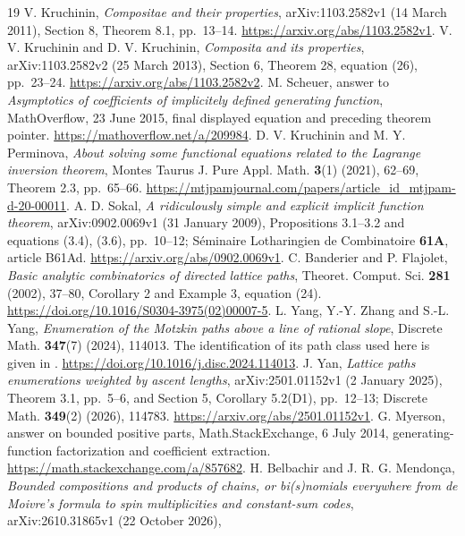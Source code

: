\documentclass[11pt]{article}
\begin{document}
\begin{thebibliography}{19}
 V. Kruchinin, \emph{Compositae and their properties},
arXiv:1103.2582v1 (14 March 2011), Section 8, Theorem 8.1, pp.~13--14.
\url{https://arxiv.org/abs/1103.2582v1}.
 V. V. Kruchinin and D. V. Kruchinin,
\emph{Composita and its properties}, arXiv:1103.2582v2 (25 March 2013),
Section 6, Theorem 28, equation (26), pp.~23--24.
\url{https://arxiv.org/abs/1103.2582v2}.
 M. Scheuer, answer to \emph{Asymptotics of coefficients
of implicitely defined generating function}, MathOverflow,
23 June 2015, final displayed equation and preceding theorem pointer.
\url{https://mathoverflow.net/a/209984}.
 D. V. Kruchinin and M. Y. Perminova,
\emph{About solving some functional equations related to the Lagrange
inversion theorem}, Montes Taurus J. Pure Appl. Math. \textbf{3}(1)
(2021), 62--69, Theorem 2.3, pp.~65--66.
\url{https://mtjpamjournal.com/papers/article_id_mtjpam-d-20-00011}.
 A. D. Sokal, \emph{A ridiculously simple and explicit
implicit function theorem}, arXiv:0902.0069v1 (31 January 2009),
Propositions 3.1--3.2 and equations (3.4), (3.6), pp.~10--12;
S\'eminaire Lotharingien de Combinatoire \textbf{61A}, article B61Ad.
\url{https://arxiv.org/abs/0902.0069v1}.
 C. Banderier and P. Flajolet,
\emph{Basic analytic combinatorics of directed lattice paths},
Theoret. Comput. Sci. \textbf{281} (2002), 37--80, Corollary 2
and Example 3, equation (24).
\url{https://doi.org/10.1016/S0304-3975(02)00007-5}.
 L. Yang, Y.-Y. Zhang and S.-L. Yang,
\emph{Enumeration of the Motzkin paths above a line of rational slope},
Discrete Math. \textbf{347}(7) (2024), 114013.
The identification of its path class used here is given in
\cite[Section 5]{yan}.
\url{https://doi.org/10.1016/j.disc.2024.114013}.
 J. Yan, \emph{Lattice paths enumerations weighted by
ascent lengths}, arXiv:2501.01152v1 (2 January 2025), Theorem 3.1,
pp.~5--6, and Section 5, Corollary 5.2(D1), pp.~12--13;
Discrete Math. \textbf{349}(2) (2026), 114783.
\url{https://arxiv.org/abs/2501.01152v1}.
 G. Myerson, answer on bounded positive parts,
Math.StackExchange, 6 July 2014, generating-function factorization
and coefficient extraction.
\url{https://math.stackexchange.com/a/857682}.
 H. Belbachir and J. R. G. Mendon\c ca,
\emph{Bounded compositions and products of chains, or bi(s)nomials
everywhere from de Moivre's formula to spin multiplicities and
constant-sum codes}, arXiv:2610.31865v1 (22 October 2026),

\end{thebibliography}
\end{document}
